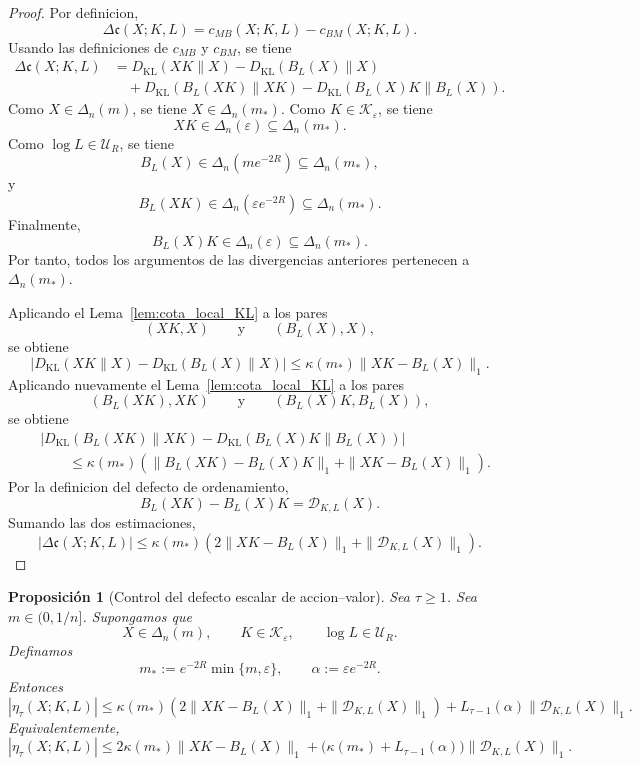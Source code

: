 \documentclass[12pt]{article}
\newtheorem{proposicion}{Proposición}[section]
\begin{document}
\begin{proof}
Por definicion,
\[
\Delta\mathfrak c(X;K,L)
=
c_{MB}(X;K,L)-c_{BM}(X;K,L).
\]
Usando las definiciones de \(c_{MB}\) y \(c_{BM}\), se tiene
\[
\begin{aligned}
\Delta\mathfrak c(X;K,L)
&=
D_{\mathrm{KL}}(XK\|X)
-
D_{\mathrm{KL}}(B_L(X)\|X)
\\
&\quad+
D_{\mathrm{KL}}(B_L(XK)\|XK)
-
D_{\mathrm{KL}}(B_L(X)K\|B_L(X)).
\end{aligned}
\]
Como \(X\in\Delta_n(m)\), se tiene \(X\in\Delta_n(m_*)\). Como \(K\in\mathcal K_\varepsilon\), se tiene
\[
XK\in\Delta_n(\varepsilon)\subseteq\Delta_n(m_*).
\]
Como \(\log L\in\mathcal U_R\), se tiene
\[
B_L(X)\in\Delta_n(me^{-2R})\subseteq\Delta_n(m_*),
\]
y
\[
B_L(XK)\in\Delta_n(\varepsilon e^{-2R})\subseteq\Delta_n(m_*).
\]
Finalmente,
\[
B_L(X)K\in\Delta_n(\varepsilon)\subseteq\Delta_n(m_*).
\]
Por tanto, todos los argumentos de las divergencias anteriores pertenecen a \(\Delta_n(m_*)\).

Aplicando el Lema~\ref{lem:cota_local_KL} a los pares
\[
(XK,X)
\qquad\text{y}\qquad
(B_L(X),X),
\]
se obtiene
\[
\left|
D_{\mathrm{KL}}(XK\|X)
-
D_{\mathrm{KL}}(B_L(X)\|X)
\right|
\le
\kappa(m_*)\|XK-B_L(X)\|_1.
\]
Aplicando nuevamente el Lema~\ref{lem:cota_local_KL} a los pares
\[
(B_L(XK),XK)
\qquad\text{y}\qquad
(B_L(X)K,B_L(X)),
\]
se obtiene
\[
\begin{aligned}
&
\left|
D_{\mathrm{KL}}(B_L(XK)\|XK)
-
D_{\mathrm{KL}}(B_L(X)K\|B_L(X))
\right|
\\
&\qquad
\le
\kappa(m_*)
\left(
\|B_L(XK)-B_L(X)K\|_1
+
\|XK-B_L(X)\|_1
\right).
\end{aligned}
\]
Por la definicion del defecto de ordenamiento,
\[
B_L(XK)-B_L(X)K
=
\mathcal D_{K,L}(X).
\]
Sumando las dos estimaciones,
\[
|\Delta\mathfrak c(X;K,L)|
\le
\kappa(m_*)
\left(
2\|XK-B_L(X)\|_1
+
\|\mathcal D_{K,L}(X)\|_1
\right).
\]
\end{proof}

\begin{proposicion}[Control del defecto escalar de accion--valor]\label{prop:control_defecto_escalar_accion_valor}
Sea \(\tau\ge 1\). Sea \(m\in(0,1/n]\). Supongamos que
\[
X\in\Delta_n(m),
\qquad
K\in\mathcal K_\varepsilon,
\qquad
\log L\in\mathcal U_R.
\]
Definamos
\[
m_*:=e^{-2R}\min\{m,\varepsilon\},
\qquad
\alpha:=\varepsilon e^{-2R}.
\]
Entonces
\[
|\eta_\tau(X;K,L)|
\le
\kappa(m_*)
\left(
2\|XK-B_L(X)\|_1
+
\|\mathcal D_{K,L}(X)\|_1
\right)
+
L_{\tau-1}(\alpha)\|\mathcal D_{K,L}(X)\|_1.
\]
Equivalentemente,
\[
|\eta_\tau(X;K,L)|
\le
2\kappa(m_*)\|XK-B_L(X)\|_1
+
\bigl(\kappa(m_*)+L_{\tau-1}(\alpha)\bigr)
\|\mathcal D_{K,L}(X)\|_1.
\]
\end{proposicion}
\end{document}
